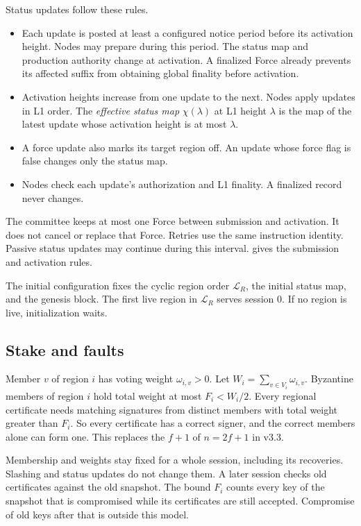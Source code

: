 \documentclass[11pt,a4paper]{article}
\begin{document}
Status updates follow these rules.
\begin{itemize}
\item Each update is posted at least a configured notice period before
its activation height. Nodes may prepare during this period. The status map and production authority change at activation.
A finalized Force already prevents its affected suffix from obtaining
global finality before activation.
\item Activation heights increase from one update to the next. Nodes
apply updates in L1 order. The \emph{effective status map}
$\chi(\lambda)$ at L1 height $\lambda$ is the map of the latest update
whose activation height is at most $\lambda$.
\item A force update also marks its target region off. An update whose
force flag is false changes only the status map.
\item Nodes check each update's authorization and L1 finality. A
finalized record never changes.
\end{itemize}
The committee keeps at most one Force between submission and activation.
It does not cancel or replace that Force. Retries use the same instruction
identity. Passive status updates may continue during this interval.
 gives the submission and activation rules.

The initial configuration fixes the cyclic region order $\mathcal L_R$,
the initial status map, and the genesis block. The first live region in
$\mathcal L_R$ serves session $0$. If no region is live, initialization
waits.

\subsection{Stake and faults}
\label{sec:stake}
Member $v$ of region $i$ has voting weight $\omega_{i,v}>0$. Let
$W_i=\sum_{v\in V_i}\omega_{i,v}$. Byzantine members of region $i$ hold
total weight at most $F_i<W_i/2$. Every regional certificate needs
matching signatures from distinct members with total weight greater than
$F_i$. So every certificate has a correct signer, and the correct members
alone can form one. This replaces the $f+1$ of $n=2f+1$ in v3.3.

Membership and weights stay fixed for a whole session, including its
recoveries. Slashing and status updates do not change them. A later
session checks old certificates against the old snapshot. The bound
$F_i$ counts every key of the snapshot that is compromised while its
certificates are still accepted. Compromise of old keys after that is
outside this model.
\end{document}
